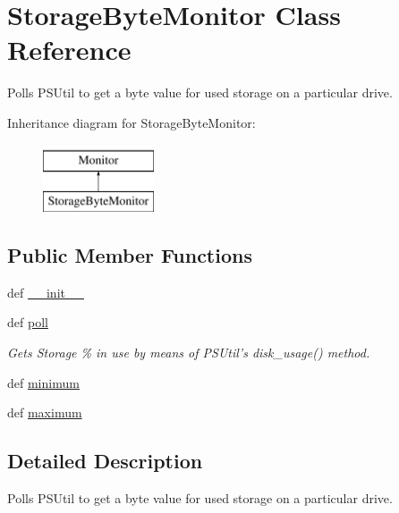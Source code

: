 \hypertarget{classsrc_1_1client_1_1_storage_byte_monitor_1_1_storage_byte_monitor}{\section{Storage\-Byte\-Monitor Class Reference}
\label{classsrc_1_1client_1_1_storage_byte_monitor_1_1_storage_byte_monitor}
}


Polls P\-S\-Util to get a byte value for used storage on a particular drive.  


Inheritance diagram for Storage\-Byte\-Monitor\-:\begin{figure}[H]
\begin{center}
\leavevmode
\includegraphics[height=2.000000cm]{classsrc_1_1client_1_1_storage_byte_monitor_1_1_storage_byte_monitor}
\end{center}
\end{figure}
\subsection*{Public Member Functions}
\begin{DoxyCompactItemize}
\item 
def \hyperlink{classsrc_1_1client_1_1_storage_byte_monitor_1_1_storage_byte_monitor_ac775ee34451fdfa742b318538164070e}{\-\_\-\-\_\-init\-\_\-\-\_\-}
\item 
def \hyperlink{classsrc_1_1client_1_1_storage_byte_monitor_1_1_storage_byte_monitor_a87cd0076a6d482a01482f25a64cf2fb4}{poll}
\begin{DoxyCompactList}\small\item\em Gets Storage \% in use by means of P\-S\-Util's disk\-\_\-usage() method. \end{DoxyCompactList}\item 
def \hyperlink{classsrc_1_1client_1_1_storage_byte_monitor_1_1_storage_byte_monitor_a4515aa6e0be4391413959391fef1109f}{minimum}
\item 
def \hyperlink{classsrc_1_1client_1_1_storage_byte_monitor_1_1_storage_byte_monitor_a8f6589fdc9d322ec8e0dc2c7ede55ce9}{maximum}
\end{DoxyCompactItemize}


\subsection{Detailed Description}
Polls P\-S\-Util to get a byte value for used storage on a particular drive. 

